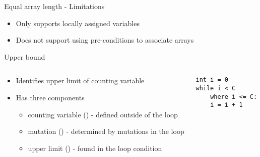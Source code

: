 \begin{frame}[fragile]{Equal array length - Limitations}

\begin{itemize}
    \item Only supports locally assigned variables
    \item Does not support using pre-conditions to associate arrays
\end{itemize}

\end{frame}



\begin{frame}[fragile]{Upper bound}

\begin{columns}

\begin{column}{0.5\textwidth}
\begin{itemize}
\item Identifies upper limit of counting variable
\item Has three components
\begin{itemize}
    \item counting variable () - defined outside of the loop 
    \item mutation (\code{<=}) - determined by mutations in the loop
    \item upper limit () - found in the loop condition
\end{itemize}
\end{itemize}
\end{column}

\begin{column}{0.5\textwidth}
\begin{verbatim}
int i = 0
while i < C
    where i <= C:
    i = i + 1
\end{verbatim}
\end{column}

\end{columns}

\end{frame}



